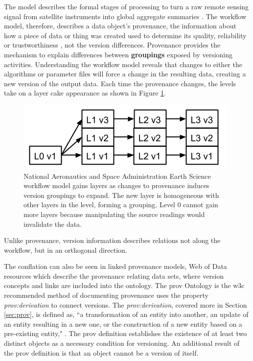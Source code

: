 The model describes the formal stages of processing to turn a raw remote sensing signal from satellite instruments into global aggregate summaries \cite{Barkstrom2003}.
The workflow model, therefore, describes a data object's \gls{provenance}, the information about how a piece of data or thing was created used to determine its quality, reliability or trustworthiness \cite{Moreau2013c}, not the version differences.
Provenance provides the mechanism to explain differences between \textbf{groupings} exposed by versioning activities.
Understanding the workflow model reveals that changes to either the algorithms or parameter files will force a change in the resulting data, creating a new version of the output data.
Each time the provenance changes, the levels take on a layer cake appearance as shown in Figure \ref{NASALayers}. 
\begin{figure}
	\centering
	\includegraphics[scale=1]{figures/VersionLayerDiagram2.png}
	\caption[Versions Layered on the National Aeronautics and Space Administration Earth Science workflow model]{National Aeronautics and Space Administration Earth Science workflow model gains layers as changes to provenance induces version groupings to expand.  The new layer is homogeneous with other layers in the level, forming a grouping.  Level 0 cannot gain more layers because manipulating the source readings would invalidate the data.}
	\label{NASALayers}
\end{figure}
Unlike provenance, version information describes relations not along the workflow, but in an orthogonal direction.

The conflation can also be seen in \gls{linked} provenance models, Web of Data resources which describe the \gls{provenance} relating data sets, where version concepts and links are included into the ontology.
The \gls{prov} Ontology is the \gls{w3c} recommended method of documenting \gls{provenance} uses the property \textit{prov:derivation} to connect versions.
The \textit{prov:derivation}, covered more in Section \ref{sec:prov}, is defined as, ``a transformation of an entity into another, an update of an entity resulting in a new one, or the construction of a new entity based on a pre-existing entity," \cite{Lebo2013}.
The \gls{prov} definition establishes the existence of at least two distinct objects as a necessary condition for versioning.
An additional result of the \gls{prov} definition is that an object cannot be a version of itself.

